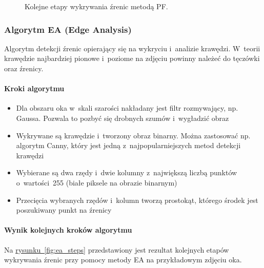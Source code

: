 \begin{figure}[!h]
\begin{center}
    \end{center}
    \caption{Kolejne etapy wykrywania źrenic metodą PF.}
    \label{fig:pf_steps}
\end{figure}






\subsubsection{Algorytm EA (Edge Analysis)}

Algorytm detekcji źrenic \cite{EyePupilWebCam} opierający się na wykryciu i~analizie krawędzi. W~teorii krawędzie najbardziej pionowe i~poziome na zdjęciu powinny należeć do tęczówki oraz źrenicy.

\paragraph{Kroki algorytmu}

\begin{itemize}
    \item Dla obszaru oka w~skali szarości nakładany jest filtr rozmywający, np. Gaussa. Pozwala to pozbyć się drobnych szumów i~wygładzić obraz
    \item Wykrywane są krawędzie i~tworzony obraz binarny. Można zastosować np. algorytm Canny, który jest jedną z~najpopularniejszych metod detekcji krawędzi
    \item Wybierane są dwa rzędy i~dwie kolumny z~największą liczbą punktów o~wartości~255 (białe piksele na obrazie binarnym)
    \item Przecięcia wybranych rzędów i~kolumn tworzą prostokąt, którego środek jest poszukiwany punkt na źrenicy
\end{itemize}

\paragraph{Wynik kolejnych kroków algorytmu}
Na \hyperref[{fig:ea_steps}]{rysunku~\ref{fig:ea_steps}} przedstawiony jest rezultat kolejnych etapów wykrywania źrenic przy pomocy metody EA na przykładowym zdjęciu oka.

